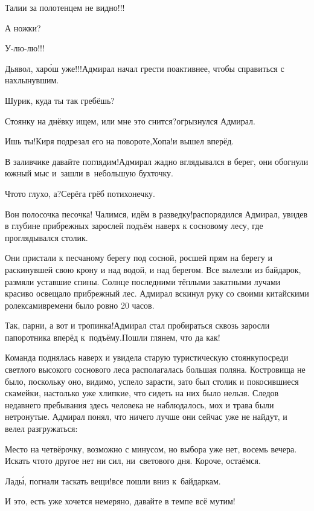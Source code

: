 \diagdash Талии за полотенцем не видно!!!

\diagdash А ножки?

\diagdash У-лю-лю!!!

\diagdash Дьявол, хар{\'о}ш уже!!!\mdash Адмирал начал грести по\sdash активнее, чтобы справиться с нахлынувшим.

\diagdash Шурик, куда ты так гребёшь?

\diagdash Стоянку на днёвку ищем, или мне это снится?\mdash огрызнулся Адмирал.

\diagdash Ишь ты!\mdash Киря подрезал его на повороте,\mdash Хопа!\mdash и вышел вперёд.

\diagdash В заливчике давайте поглядим!\mdash Адмирал жадно вглядывался в берег, они обогнули южный мыс и~зашли в~небольшую бухточку.

\diagdash Что\sdash то глухо, а?\mdash Серёга грёб потихонечку.

\diagdash Вон полосочка песочка! Чалимся, идём в разведку!\mdash распорядился Адмирал, увидев в глубине прибрежных зарослей подъём наверх к сосновому лесу, где проглядывался столик.

Они пристали к песчаному берегу под сосной, росшей прям на берегу и раскинувшей свою крону и над водой, и над берегом. Все вылезли из байдарок, размяли уставшие спины. Солнце последними тёплыми закатными лучами красиво освещало прибрежный лес. Адмирал вскинул руку со своими китайскими ролексами\mdash времени было ровно 20 часов.

\diagdash Так, парни, а вот и тропинка!\mdash Адмирал стал пробираться сквозь заросли папоротника вперёд к~подъёму.\mdash Пошли глянем, что да как!

Команда поднялась наверх и увидела старую туристическую стоянку\mdash посреди светлого высокого соснового леса располагалась большая поляна. Костровища не было, поскольку оно, видимо, успело зарасти, зато был столик и покосившиеся скамейки, настолько уже хлипкие, что сидеть на них было нельзя. Следов недавнего пребывания здесь человека не наблюдалось, мох и трава были нетронутые. Адмирал понял, что ничего лучше они сейчас уже не найдут, и велел разгружаться:

\diagdash Место на четвёрочку, возможно с минусом, но выбора уже нет, восемь вечера. Искать что\sdash то другое нет ни сил, ни~светового дня. Короче, остаёмся.

\diagdash Лад\'{ы}, погнали таскать вещи!\mdash все пошли вниз к~байдаркам.

\diagdash И это, есть уже хочется немеряно, давайте в темпе всё мутим!

